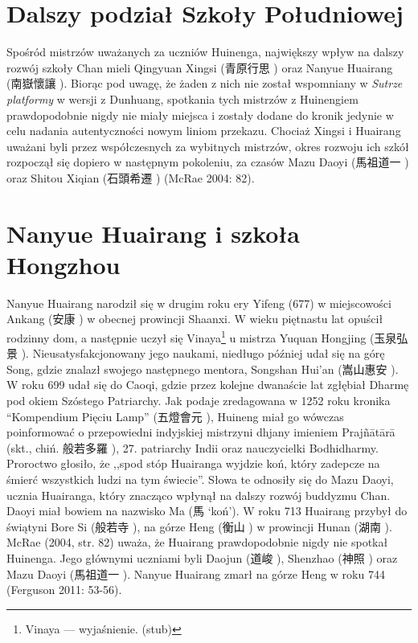 \section{Dalszy podział Szkoły Południowej}
Spośród mistrzów uważanych za uczniów Huinenga, największy wpływ na dalszy rozwój szkoły Chan mieli Qingyuan Xingsi (青原行思 ) oraz Nanyue Huairang (南嶽懷讓 ).
Biorąc pod uwagę, że żaden z nich nie został wspomniany w \textit{Sutrze platformy} w wersji z Dunhuang, spotkania tych mistrzów z Huinengiem prawdopodobnie nigdy nie miały miejsca i zostały dodane do kronik jedynie w celu nadania autentyczności nowym liniom przekazu.
Chociaż Xingsi i Huairang uważani byli przez współczesnych za wybitnych mistrzów, okres rozwoju ich szkół rozpoczął się dopiero w następnym pokoleniu, za czasów Mazu Daoyi (馬祖道一 ) oraz Shitou Xiqian  (石頭希遷 ) %
(McRae 2004: 82).

\section{Nanyue Huairang i szkoła Hongzhou}
Nanyue Huairang narodził się w drugim roku ery Yifeng (677) w miejscowości Ankang (安康 ) w obecnej prowincji Shaanxi.
W wieku piętnastu lat opuścił rodzinny dom, a następnie uczył się Vinaya\footnote{Vinaya --- wyjaśnienie. (stub)} u mistrza Yuquan Hongjing (玉泉弘景 ).
Nieusatysfakcjonowany jego naukami, niedługo później udał się na górę Song, gdzie znalazł swojego następnego mentora, Songshan Hui'an (嵩山惠安 ).
W roku 699 udał się do Caoqi, gdzie przez kolejne dwanaście lat zgłębiał Dharmę pod okiem Szóstego Patriarchy.
Jak podaje zredagowana w 1252 roku kronika ``Kompendium Pięciu Lamp'' (五燈會元 ), Huineng miał go wówczas poinformować o przepowiedni indyjskiej mistrzyni dhjany imieniem Prajñātārā (skt., chiń. 般若多羅 ), 27. patriarchy Indii oraz nauczycielki Bodhidharmy.
Proroctwo głosiło, że ,,spod stóp Huairanga wyjdzie koń, który zadepcze na śmierć wszystkich ludzi na tym świecie''.
Słowa te odnosiły się do Mazu Daoyi, ucznia Huairanga, który znacząco wpłynął na dalszy rozwój buddyzmu Chan.
Daoyi miał bowiem na nazwisko Ma (馬  `koń').
W roku 713 Huairang przybył do świątyni Bore Si (般若寺 ), na górze Heng (衡山 ) w prowincji Hunan (湖南 ).
McRae (2004, str. 82) uważa, że Huairang prawdopodobnie nigdy nie spotkał Huinenga.
Jego głównymi uczniami byli Daojun (道峻 ), Shenzhao (神照 ) oraz Mazu Daoyi (馬祖道一 ).
Nanyue Huairang zmarł na górze Heng w roku 744
(Ferguson 2011: 53-56).


